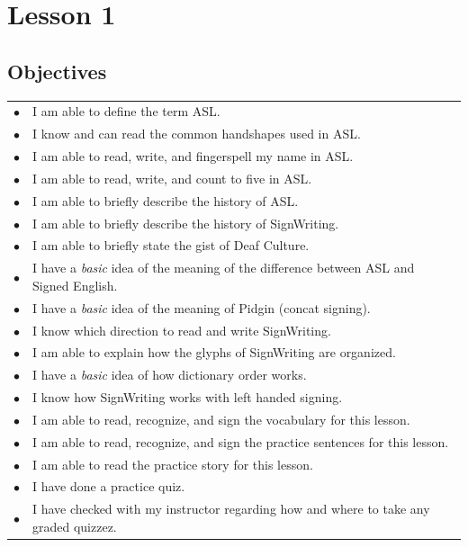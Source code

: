 \documentclass{article}
\begin{document}
\newfontfamily{}
\newfontfamily{}
\newcommand{\bul}{\hfil$\bullet$&}
\renewenvironment{glossary}{\begin{multicols}{5}\begin{center}}{\end{center}\end{multicols}}
\setcounter{secnumdepth}{0}
\setlength{\columnseprule}{1pt}

\section{Lesson 1}

\subsection{Objectives}

\begin{tabular}{p{1cm}p{14cm}}
\bul I am able to define the term ASL.\\
\bul I know and can read the common handshapes used in ASL.\\
\bul I am able to read, write, and fingerspell my name in ASL.\\
\bul I am able to read, write, and count to five in ASL.\\
\bul I am able to briefly describe the history of ASL.\\
\bul I am able to briefly describe the history of SignWriting.\\
\bul I am able to briefly state the gist of Deaf Culture.\\
\bul I have a \emph{basic} idea of the meaning of the difference between ASL and Signed English.\\
\bul I have a \emph{basic} idea of the meaning of Pidgin (concat signing).\\
\bul I know which direction to read and write SignWriting.\\
\bul I am able to explain how the glyphs of SignWriting are organized.\\
\bul I have a \emph{basic} idea of how dictionary order works.\\
\bul I know how SignWriting works with left handed signing.\\
\bul I am able to read, recognize, and sign the vocabulary for this lesson.\\
\bul I am able to read, recognize, and sign the practice sentences for this lesson.\\
\bul I am able to read the practice story for this lesson.\\
\bul I have done a practice quiz.\\
\bul I have checked with my instructor regarding how and where to take any graded quizzez.\\
\end{tabular}
\end{document}
